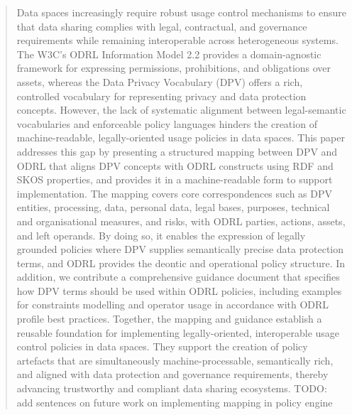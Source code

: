 \documentclass{ceurart}
\begin{document}
\begin{abstract}
Data spaces increasingly require robust usage control mechanisms to ensure that data sharing complies with legal, contractual, and governance requirements while remaining interoperable across heterogeneous systems. The W3C's ODRL Information Model 2.2 provides a domain-agnostic framework for expressing permissions, prohibitions, and obligations over assets, whereas the Data Privacy Vocabulary (DPV) offers a rich, controlled vocabulary for representing privacy and data protection concepts.
However, the lack of systematic alignment between legal-semantic vocabularies and enforceable policy languages hinders the creation of machine-readable, legally-oriented usage policies in data spaces.
This paper addresses this gap by presenting a structured mapping between DPV and ODRL that aligns DPV concepts with ODRL constructs using RDF and SKOS properties, and provides it in a machine-readable form to support implementation.
The mapping covers core correspondences such as DPV entities, processing, data, personal data, legal bases, purposes, technical and organisational measures, and risks, with ODRL parties, actions, assets, and left operands. 
By doing so, it enables the expression of legally grounded policies where DPV supplies semantically precise data protection terms, and ODRL provides the deontic and operational policy structure.
In addition, we contribute a comprehensive guidance document that specifies how DPV terms should be used within ODRL policies, including examples for constraints modelling and operator usage in accordance with ODRL profile best practices. 
Together, the mapping and guidance establish a reusable foundation for implementing legally-oriented, interoperable usage control policies in data spaces. They support the creation of policy artefacts that are simultaneously machine-processable, semantically rich, and aligned with data protection and governance requirements, thereby advancing trustworthy and compliant data sharing ecosystems.
TODO: add sentences on future work on implementing mapping in policy engine
\end{abstract}
\end{document}

